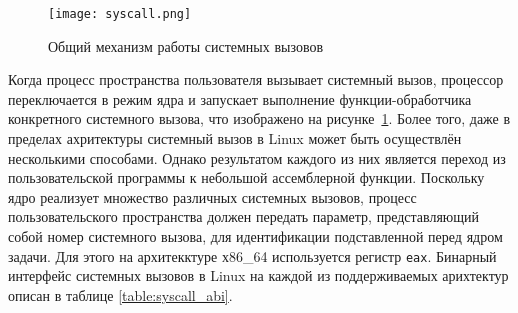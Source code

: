 \begin{figure}
  \centering
  \texttt{[image: syscall.png]}
  \caption{Общий механизм работы системных вызовов}
  \label{fig:syscall}
\end{figure}

Когда процесс пространства пользователя вызывает системный вызов, процессор
переключается в режим ядра и запускает выполнение функции-обработчика
конкретного системного вызова, что изображено на рисунке~\ref{fig:syscall}.
Более того, даже в пределах ахритектуры системный вызов в Linux может быть
осуществлён несколькими способами. Однако результатом каждого из них является
переход из пользовательской программы к небольшой ассемблерной функции.
Поскольку ядро реализует множество различных системных вызовов, процесс
пользовательского пространства должен передать параметр, представляющий собой
номер системного вызова, для идентификации подставленной перед ядром задачи. Для
этого на архитекктуре х86\_64 используется регистр \texttt{eax}. Бинарный
интерфейс системных вызовов в Linux на каждой из поддерживаемых арихтектур
описан в таблице \ref{table:syscall_abi}.

